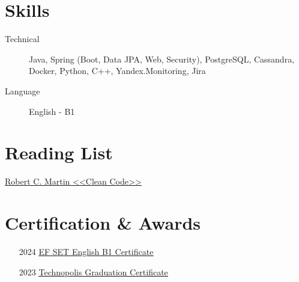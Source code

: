 \documentclass[11pt]{article}
\begin{document}
\section{Skills}
\begin{description}
    \item[Technical] Java, Spring (Boot, Data JPA, Web, Security), PostgreSQL, Cassandra, Docker, Python, C++, Yandex.Monitoring, Jira
    \item[Language] English - B1
\end{description}

\section{Reading List}
\begin{description}
    \item \href{https://www.amazon.com/Clean-Code-Handbook-Software-Craftsmanship/dp/0132350882}{Robert C. Martin <<Clean Code>>}
\end{description}

\section{Certification \& Awards}
\begin{enumerate}[itemsep=0pt]
    \item [2024] \href{https://disk.yandex.ru/i/_CuHJW-1k6qG8A}{\underline{EF SET English B1 Certificate}}
    \item [2023] \href{https://disk.yandex.ru/i/Ftcyy4kuYyXlEQ}{\underline{Technopolis Graduation Certificate}}
\end{enumerate}
\end{document}
